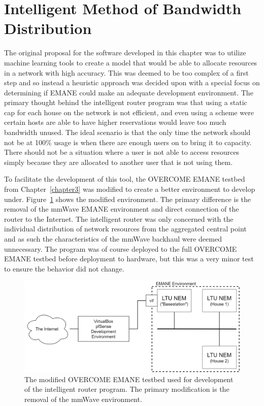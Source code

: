 \section{Intelligent Method of Bandwidth Distribution}
The original proposal for the software developed in this chapter was to utilize machine learning tools to create a model that would be able to allocate resources in a network with high accuracy.
This was deemed to be too complex of a first step and so instead a heuristic approach was decided upon with a special focus on determining if EMANE could make an adequate development environment.
The primary thought behind the intelligent router program was that using a static cap for each house on the network is not efficient, and even using a scheme were certain hosts are able to have higher reservations would leave too much bandwidth unused.
The ideal scenario is that the only time the network should not be at 100\% usage is when there are enough users on to bring it to capacity.
There should not be a situation where a user is not able to access resources simply because they are allocated to another user that is not using them.\par
To facilitate the development of this tool, the OVERCOME EMANE testbed from Chapter~\ref{chapter3} was modified to create a better environment to develop under. 
Figure~\ref{pfsense_dev} shows the modified environment.
The primary difference is the removal of the mmWave EMANE environment and direct connection of the router to the Internet.
The intelligent router was only concerned with the individual distribution of network resources from the aggregated central point and as such the characteristics of the mmWave backhaul were deemed unnecessary.
The program was of course deployed to the full OVERCOME EMANE testbed before deployment to hardware, but this was a very minor test to ensure the behavior did not change.
\begin{figure}[!ht]
    \centering
    \includegraphics[width=\textwidth,keepaspectratio]{Images/Chpt4/pfsense_dev.png}
    \caption{The modified OVERCOME EMANE testbed used for development of the intelligent router program. The primary modification is the removal of the mmWave environment.}
    \label{pfsense_dev}
\end{figure}

